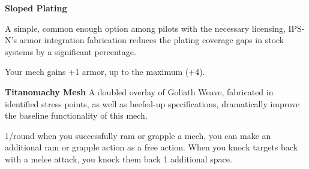 \textbf{Sloped Plating}

A simple, common enough option among pilots with the necessary licensing, IPS-N's armor integration fabrication reduces the plating coverage gaps in stock systems by a significant percentage.

Your mech gains +1 armor, up to the maximum (+4).


\textbf{Titanomachy Mesh}
A doubled overlay of Goliath Weave, fabricated in identified stress points, as well as beefed-up specifications, dramatically improve the baseline functionality of this mech.

1/round when you successfully ram or grapple a mech, you can make an additional ram or grapple action as a free action. When you knock targets back with a melee attack, you knock them back 1 additional space.
